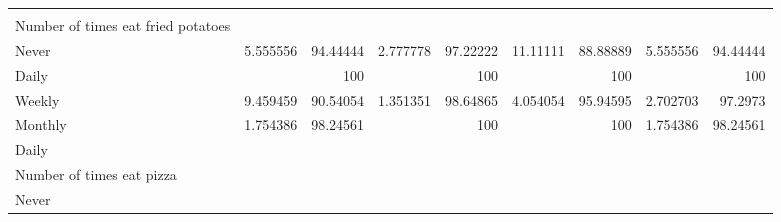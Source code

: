 \documentclass{article}
\begin{document}
\begin{tabular}{lllllllll}
  \multicolumn{1}{r}{} &
  \multicolumn{1}{r}{} &
  \multicolumn{1}{r}{} \\
\multicolumn{1}{l}{\hspace{6em}Number of times eat fried potatoes} &
  \multicolumn{1}{|r}{} &
  \multicolumn{1}{r}{} &
  \multicolumn{1}{r}{} &
  \multicolumn{1}{r}{} &
  \multicolumn{1}{r}{} &
  \multicolumn{1}{r}{} &
  \multicolumn{1}{r}{} &
  \multicolumn{1}{r}{} \\
\multicolumn{1}{l}{\hspace{7em}Never} &
  \multicolumn{1}{|r}{5.555556} &
  \multicolumn{1}{r}{94.44444} &
  \multicolumn{1}{r}{2.777778} &
  \multicolumn{1}{r}{97.22222} &
  \multicolumn{1}{r}{11.11111} &
  \multicolumn{1}{r}{88.88889} &
  \multicolumn{1}{r}{5.555556} &
  \multicolumn{1}{r}{94.44444} \\
\multicolumn{1}{l}{\hspace{7em}Daily} &
  \multicolumn{1}{|r}{} &
  \multicolumn{1}{r}{100} &
  \multicolumn{1}{r}{} &
  \multicolumn{1}{r}{100} &
  \multicolumn{1}{r}{} &
  \multicolumn{1}{r}{100} &
  \multicolumn{1}{r}{} &
  \multicolumn{1}{r}{100} \\
\multicolumn{1}{l}{\hspace{7em}Weekly} &
  \multicolumn{1}{|r}{9.459459} &
  \multicolumn{1}{r}{90.54054} &
  \multicolumn{1}{r}{1.351351} &
  \multicolumn{1}{r}{98.64865} &
  \multicolumn{1}{r}{4.054054} &
  \multicolumn{1}{r}{95.94595} &
  \multicolumn{1}{r}{2.702703} &
  \multicolumn{1}{r}{97.2973} \\
\multicolumn{1}{l}{\hspace{7em}Monthly} &
  \multicolumn{1}{|r}{1.754386} &
  \multicolumn{1}{r}{98.24561} &
  \multicolumn{1}{r}{} &
  \multicolumn{1}{r}{100} &
  \multicolumn{1}{r}{} &
  \multicolumn{1}{r}{100} &
  \multicolumn{1}{r}{1.754386} &
  \multicolumn{1}{r}{98.24561} \\
\multicolumn{1}{l}{\hspace{3em}Daily} &
  \multicolumn{1}{|r}{} &
  \multicolumn{1}{r}{} &
  \multicolumn{1}{r}{} &
  \multicolumn{1}{r}{} &
  \multicolumn{1}{r}{} &
  \multicolumn{1}{r}{} &
  \multicolumn{1}{r}{} &
  \multicolumn{1}{r}{} \\
\multicolumn{1}{l}{\hspace{4em}Number of times eat pizza} &
  \multicolumn{1}{|r}{} &
  \multicolumn{1}{r}{} &
  \multicolumn{1}{r}{} &
  \multicolumn{1}{r}{} &
  \multicolumn{1}{r}{} &
  \multicolumn{1}{r}{} &
  \multicolumn{1}{r}{} &
  \multicolumn{1}{r}{} \\
\multicolumn{1}{l}{\hspace{5em}Never} &

\end{tabular}
\end{document}
